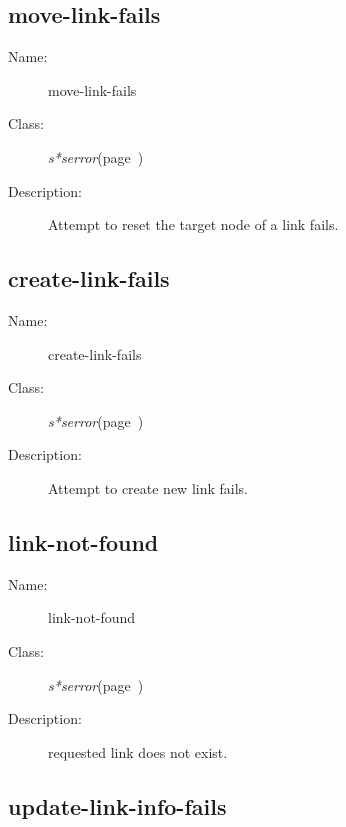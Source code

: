 \subsection{move-link-fails}
\label{move-link-fails}

\begin{description}
\item [Name:]  move-link-fails


\item [Class:]
{\sl s*serror}\hfill(page~\pageref{s*serror})

\item [Description:]
Attempt to reset the target node of a link fails.


\end{description}
\horizontalline

\subsection{create-link-fails}
\label{create-link-fails}

\begin{description}

\item [Name:]  create-link-fails


\item [Class:]
{\sl s*serror}\hfill(page~\pageref{s*serror})


\item [Description:]
Attempt to create new link fails.


\end{description}
\horizontalline

\subsection{link-not-found}
\label{link-not-found}

\begin{description}
\item [Name:]  link-not-found

\item [Class:]
{\sl s*serror}\hfill(page~\pageref{s*serror})

\item [Description:] requested link does not exist. 



\end{description}
\horizontalline

\subsection{update-link-info-fails}
\label{update-link-info-fails}


